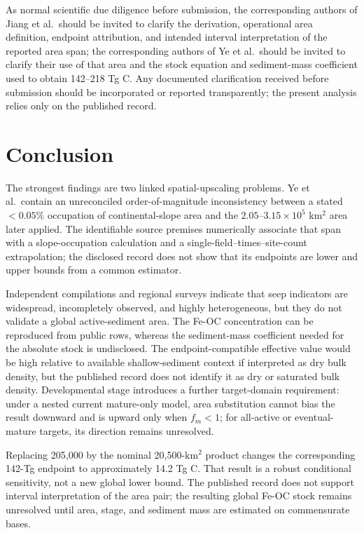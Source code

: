 \documentclass[11pt,letterpaper]{article}
\begin{document}
As normal scientific due diligence before submission, the corresponding authors of Jiang et al.\ should be invited to clarify the derivation, operational area definition, endpoint attribution, and intended interval interpretation of the reported area span; the corresponding authors of Ye et al.\ should be invited to clarify their use of that area and the stock equation and sediment-mass coefficient used to obtain 142--218 Tg C. Any documented clarification received before submission should be incorporated or reported transparently; the present analysis relies only on the published record.

\section{Conclusion}

The strongest findings are two linked spatial-upscaling problems. Ye et al.\ contain an unreconciled order-of-magnitude inconsistency between a stated $<0.05\%$ occupation of continental-slope area and the $2.05$--$3.15\times10^5$ km$^2$ area later applied. The identifiable source premises numerically associate that span with a slope-occupation calculation and a single-field--times--site-count extrapolation; the disclosed record does not show that its endpoints are lower and upper bounds from a common estimator.

Independent compilations and regional surveys indicate that seep indicators are widespread, incompletely observed, and highly heterogeneous, but they do not validate a global active-sediment area. The Fe-OC concentration can be reproduced from public rows, whereas the sediment-mass coefficient needed for the absolute stock is undisclosed. The endpoint-compatible effective value would be high relative to available shallow-sediment context if interpreted as dry bulk density, but the published record does not identify it as dry or saturated bulk density. Developmental stage introduces a further target-domain requirement: under a nested current mature-only model, area substitution cannot bias the result downward and is upward only when $f_m<1$; for all-active or eventual-mature targets, its direction remains unresolved.

Replacing 205,000 by the nominal 20,500-km$^2$ product changes the corresponding 142-Tg endpoint to approximately 14.2 Tg C. That result is a robust conditional sensitivity, not a new global lower bound. The published record does not support interval interpretation of the area pair; the resulting global Fe-OC stock remains unresolved until area, stage, and sediment mass are estimated on commensurate bases.
\end{document}
